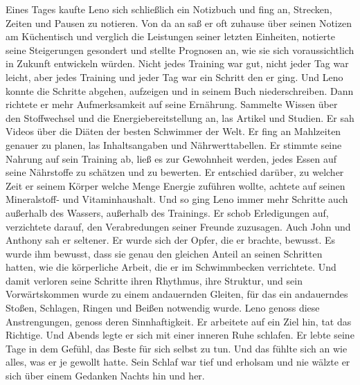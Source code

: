 \documentclass[ngerman,smalldemyvopaper,11pt,oneside,onecolumn,openright,extrafontsizes]{memoir}
\begin{document}
Eines Tages kaufte Leno sich schließlich ein Notizbuch und fing an, Strecken, Zeiten und Pausen zu notieren. Von da an saß er oft zuhause über seinen Notizen am Küchentisch und verglich die Leistungen seiner letzten Einheiten, notierte seine Steigerungen gesondert und stellte Prognosen an, wie sie sich voraussichtlich in Zukunft entwickeln würden. Nicht jedes Training war gut, nicht jeder Tag war leicht, aber jedes Training und jeder Tag war ein Schritt den er ging. Und Leno konnte die Schritte abgehen, aufzeigen und in seinem Buch niederschreiben. Dann richtete er mehr Aufmerksamkeit auf seine Ernährung. Sammelte Wissen über den Stoffwechsel und die Energiebereitstellung an, las Artikel und Studien. Er sah Videos über die Diäten der besten Schwimmer der Welt. Er fing an Mahlzeiten genauer zu planen, las Inhaltsangaben und Nährwerttabellen. Er stimmte seine Nahrung auf sein Training ab, ließ es zur Gewohnheit werden, jedes Essen auf seine Nährstoffe zu schätzen und zu bewerten. Er entschied darüber, zu welcher Zeit er seinem Körper welche Menge Energie zuführen wollte, achtete auf seinen Mineralstoff- und Vitaminhaushalt. Und so ging Leno immer mehr Schritte auch außerhalb des Wassers, außerhalb des Trainings. Er schob Erledigungen auf, verzichtete darauf, den Verabredungen seiner Freunde zuzusagen. Auch John und Anthony sah er seltener. Er wurde sich der Opfer, die er brachte, bewusst. Es wurde ihm bewusst, dass sie genau den gleichen Anteil an seinen Schritten hatten, wie die körperliche Arbeit, die er im Schwimmbecken verrichtete. Und damit verloren seine Schritte ihren Rhythmus, ihre Struktur, und sein Vorwärtskommen wurde zu einem andauernden Gleiten, für das ein andauerndes Stoßen, Schlagen, Ringen und Beißen notwendig wurde. Leno genoss diese Anstrengungen, genoss deren Sinnhaftigkeit. Er arbeitete auf ein Ziel hin, tat das Richtige. Und Abends legte er sich mit einer inneren Ruhe schlafen. Er lebte seine Tage in dem Gefühl, das Beste für sich selbst zu tun. Und das fühlte sich an wie alles, was er je gewollt hatte. Sein Schlaf war tief und erholsam und nie wälzte er sich über einem Gedanken Nachts hin und her.
\end{document}
